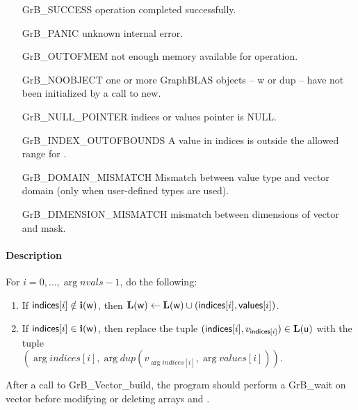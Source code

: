 \begin{itemize}[leftmargin=2.1in]
\item[{\sf GrB\_SUCCESS}]     operation completed successfully.
\item[{\sf GrB\_PANIC}]       unknown internal error.
\item[{\sf GrB\_OUTOFMEM}]    not enough memory available for operation.
\item[{\sf GrB\_NOOBJECT}]    one or more GraphBLAS objects -- {\sf w} or {\sf dup} -- 
                            have not been initialized by a call to {\sf new}.
\item[{\sf GrB\_NULL\_POINTER}]  {\sf indices} or {\sf values} pointer is {\sf NULL}.
\item[{\sf GrB\_INDEX\_OUTOFBOUNDS}]
                            A value in {\sf indices} is outside the allowed range for .
\item[\sf GrB\_DOMAIN\_MISMATCH]  
                       Mismatch between value type and vector domain
                       (only when user-defined types are used).
\item[\sf GrB\_DIMENSION\_MISMATCH]  
                       mismatch between dimensions of vector and mask. 
\end{itemize}

\paragraph{Description}

For $i = 0,\ldots,\arg{nvals}-1$, do the following:
\begin{enumerate}
    \item If $\arg{indices}[i] \notin \bold{i}(\arg{w})$, then $\bold{L}(\arg{w}) \leftarrow \bold{L}(\arg{w}) \cup (\arg{indices}[i], \arg{values}[i])$.
    \item If $\arg{indices}[i] \in \bold{i}(\arg{w})$, then replace the tuple $(\arg{indices}[i], v_{\arg{indices}[i]}) \in \bold{L}(\arg{u})$ with the tuple \\ $(\arg{indices}[i], \arg{dup}(v_{\arg{indices}[i]},\arg{values}[i]))$.
\end{enumerate}



After a call to {\sf GrB\_Vector\_build}, the program should perform a 
{\sf GrB\_wait} on vector  before
modifying or deleting arrays  and .

